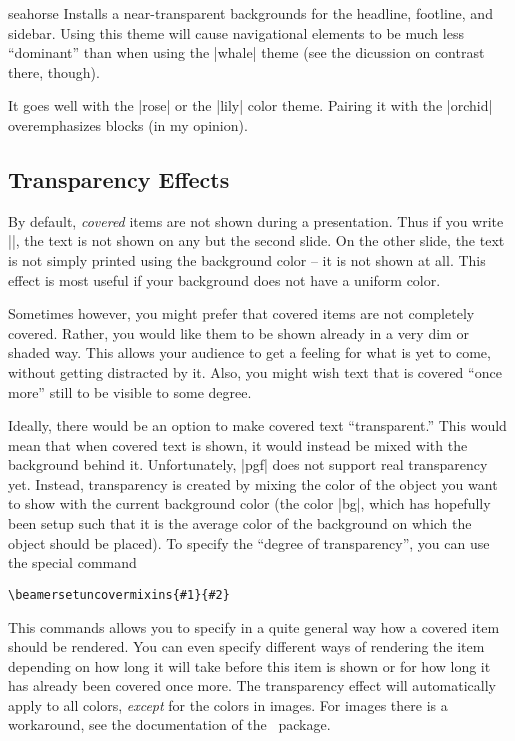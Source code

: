 \begin{colorthemeexample}{seahorse}
  Installs a near-transparent backgrounds for the headline, footline,
  and sidebar. Using this theme will cause navigational elements to be
  much less ``dominant'' than when using the |whale| theme (see the
  dicussion on contrast there, though).

  It goes well with the |rose| or the |lily| color theme. Pairing it
  with the |orchid| overemphasizes blocks (in my opinion).
\end{colorthemeexample}




\subsection{Transparency Effects}
\label{section-transparent}

By default, \emph{covered} items are not shown during a
presentation. Thus if you write ||, the text
is not shown on any but the second slide. On the other slide, the text
is not simply printed using the background color -- it is not shown at
all. This effect is most useful if your background does not have a
uniform color.

Sometimes however, you might prefer that covered items are not
completely covered. Rather, you would like them to be shown already in
a very dim or shaded way. This allows your audience to get a feeling
for what is yet to come, without getting distracted by it. Also, you
might wish text that is covered ``once more'' still to be visible to
some degree.

Ideally, there would be an option to make covered text
``transparent.'' This would mean that when covered text is shown, it
would instead be mixed with the background behind it. Unfortunately,
|pgf| does not support real transparency yet. Instead, transparency is
created by mixing the color of the object you want to show with the
current background color (the color |bg|, which has hopefully been
setup such that it is the average color of the background on which the
object should be placed). To specify the ``degree of
transparency'', you can use the special command
\begin{verbatim}
\beamersetuncovermixins{#1}{#2}
\end{verbatim}
This commands allows you to specify in a quite general way how a
covered item should be rendered. You can even specify different ways
of rendering the item depending on how long it will take before this
item is shown or for how long it has already been covered once
more. The transparency effect will automatically apply to all colors,
\emph{except} for the colors in images. For images there is a
workaround, see the documentation of the \pgf\ package. 

